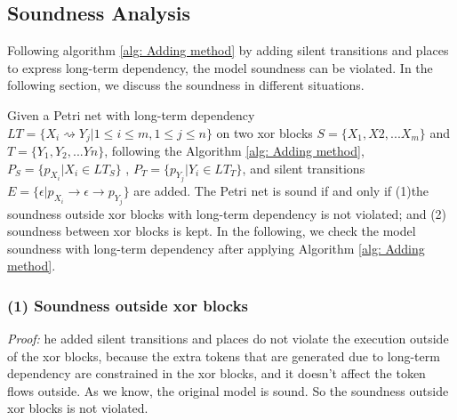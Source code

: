 \subsection{Soundness Analysis}
Following algorithm \ref{alg: Adding method} by adding silent transitions and places to express long-term dependency, the model soundness can be violated. In the following section, we discuss the soundness in different situations. 

Given a Petri net with long-term dependency $LT=\{X_i \rightsquigarrow Y_j \vert 1 \leq i \leq m, 1 \leq j \leq n \}$ on two xor blocks $S=\{X_1,X2,...X_m\}$ and $T=\{Y_1,Y_2,...Yn\}$, following the Algorithm \ref{alg: Adding method}, $P_S=\{p_{X_i} \vert X_i \in LT_{S} \}$ , $P_T=\{p_{Y_j} \vert Y_i \in LT_{T} \}$, and silent transitions $ E = \{\epsilon \vert p_{X_i} \rightarrow \epsilon
 \rightarrow p_{Y_{j}} \}$ are added. The Petri net is sound if and only if (1)the soundness outside xor blocks with long-term dependency is not violated; and  (2) soundness between xor blocks is kept. In the following, we check the model soundness with long-term dependency after applying Algorithm \ref{alg: Adding method}.
\subsubsection{(1) Soundness outside xor blocks}
\emph{Proof:} he added silent transitions and places do not violate the execution outside of the xor blocks, because the extra tokens that are generated due to long-term dependency are constrained in the xor blocks, and it doesn't affect the token flows outside. As we know, the original model is sound. So the soundness outside xor blocks is not violated.
